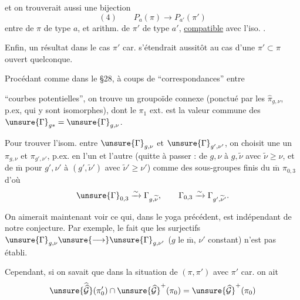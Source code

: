 et on trouverait aussi une bijection
\[
(4)\qquad P_a(\pi)\longrightarrow P_{a'}(\pi')
\]
entre  de $\pi$ de type $a$, et arithm. de $\pi'$ de type $a'$, \uline{compatible} avec l'iso. .

Enfin, un résultat dans le cas $\pi'$  car. s'étendrait aussitôt au cas d'une $\pi'\subset\pi$ ouvert quelconque.

Procédant  comme dans le \S 28, à coups de ``correspondances''  entre


``courbes potentielles'', on trouve un groupoïde connexe (ponctué par les $\widehat{\pi}_{g,\nu}$, p.ex, \deleted{\unsure{)}} qui y sont  isomorphes), dont le $\pi_1$ ext. est la valeur commune des $\unsure{\Gamma}_{g*}=\unsure{\Gamma}_{g,\nu}$.

Pour trouver  l'isom.  entre $\unsure{\Gamma}_{g,\nu}$ et $\unsure{\Gamma}_{g',\nu'}$, on choisit une   un $\pi_{g,\nu}$ et $\pi_{g',\nu'}$, p.ex. en   l'un et l'autre (quitte à passer : de $g,\nu$ à $g,\widetilde{\nu}$ avec $\widetilde{\nu}\geq\nu$, et de $\overline{\mathrm m}$ pour $g',\nu'$ à $(g',\widetilde{\nu}')$ avec $\widetilde{\nu}'\geq\nu'$) comme des sous-groupes finis du $\overline{\mathrm m}$ $\pi_{0,3}$  d'où
\[
\unsure{\Gamma}_{0,3}\xrightarrow{\sim}\Gamma_{g,\widetilde{\nu}},
\qquad
\Gamma_{0,3}\xrightarrow{\sim}\Gamma_{g',\widetilde{\nu}'}.
\]

On aimerait maintenant voir ce qui, dans le yoga précédent, est indépendant de notre conjecture. Par exemple, le fait que les  surjectifs  $\unsure{\Gamma}_{g,\nu}\unsure{\longrightarrow}\unsure{\Gamma}_{g,\nu'}$ ($g$ le $\overline{\mathrm m}$, $\nu'$ constant) n'est pas établi.

Cependant, si on savait que dans la situation de $(\pi,\pi')$ avec $\pi'$  car. on ait
\[
\unsure{\widehat{\widehat{\mathcal G}}}(\pi'_0)\cap
\unsure{\widehat{\mathcal G}}^{+}(\pi_0)
=
\unsure{\widehat{\mathcal G}}^{+}(\pi_0)
\]


